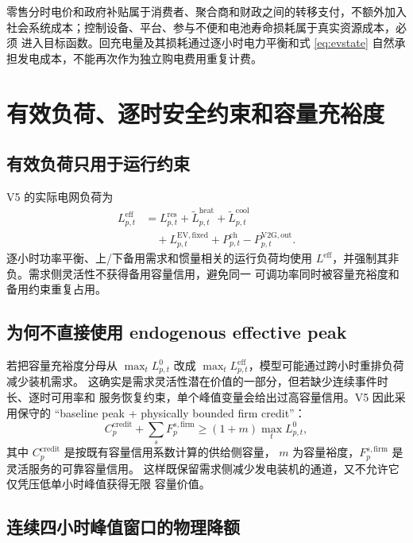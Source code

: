 \documentclass[UTF8,fontset=fandol,12pt]{ctexart}
\begin{document}
零售分时电价和政府补贴属于消费者、聚合商和财政之间的转移支付，不额外加入
社会系统成本；控制设备、平台、参与不便和电池寿命损耗属于真实资源成本，必须
进入目标函数。回充电量及其损耗通过逐小时电力平衡和式 \eqref{eq:evstate}
自然承担发电成本，不能再次作为独立购电费用重复计费。

\section{有效负荷、逐时安全约束和容量充裕度}

\subsection{有效负荷只用于运行约束}

V5 的实际电网负荷为
\begin{align}
  L^{\mathrm{eff}}_{p,t}
  &=
  L^{\mathrm{res}}_{p,t}
  +\widetilde L^{\mathrm{heat}}_{p,t}
  +\widetilde L^{\mathrm{cool}}_{p,t} \nonumber\\
  &\quad
  +L^{\mathrm{EV,fixed}}_{p,t}
  +P^{\mathrm{ch}}_{p,t}
  -P^{\mathrm{V2G,out}}_{p,t}.
  \label{eq:effective}
\end{align}
逐小时功率平衡、上/下备用需求和惯量相关的运行负荷均使用
$L^{\mathrm{eff}}$，并强制其非负。需求侧灵活性不获得备用容量信用，避免同一
可调功率同时被容量充裕度和备用约束重复占用。

\subsection{为何不直接使用 endogenous effective peak}

若把容量充裕度分母从 $\max_t L^0_{p,t}$ 改成
$\max_t L^{\mathrm{eff}}_{p,t}$，模型可能通过跨小时重排负荷减少装机需求。
这确实是需求灵活性潜在价值的一部分，但若缺少连续事件时长、逐时可用率和
服务恢复约束，单个峰值变量会给出过高容量信用。V5 因此采用保守的
``baseline peak + physically bounded firm credit''：
\begin{equation}
  C^{\mathrm{credit}}_p
  +\sum_s F^{s,\mathrm{firm}}_p
  \ge
  (1+m)\max_t L^0_{p,t},
  \label{eq:adequacy}
\end{equation}
其中 $C^{\mathrm{credit}}_p$ 是按既有容量信用系数计算的供给侧容量，
$m$ 为容量裕度，$F^{s,\mathrm{firm}}_p$ 是灵活服务的可靠容量信用。
这样既保留需求侧减少发电装机的通道，又不允许它仅凭压低单小时峰值获得无限
容量价值。

\subsection{连续四小时峰值窗口的物理降额}
\end{document}
